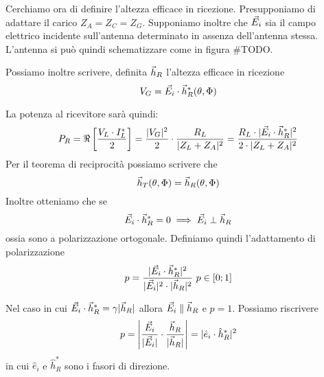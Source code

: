Cerchiamo ora di definire l'altezza efficace in ricezione. Presupponiamo di adattare il carico $Z_A=Z_C=Z_G$. Supponiamo inoltre che $\vec{E}_i$ sia il campo elettrico incidente sull'antenna determinato in assenza dell'antenna stessa. L'antenna si può quindi schematizzare come in figura \#TODO.

Possiamo inoltre scrivere, definita $\vec{h}_R$ l'altezza efficace in ricezione
\begin{equation}
  V_G=\vec{E}_i \cdot \vec{h}_R^*(\theta,\Phi)
\end{equation}

La potenza al ricevitore sarà quindi:
\begin{equation}
  P_R=\Re\left[\frac{V_L \cdot I_L^*}{2}\right] = \frac{|V_G|^2}{2} \cdot \frac{R_L}{|Z_L+Z_A|^2} =\frac{R_L \cdot |\vec{E}_i \cdot \vec{h}_R^*|^2}{2\cdot|Z_L+Z_A|^2}
\end{equation}
Per il teorema di reciprocità possiamo scrivere che
\begin{equation}
  \vec{h}_T(\theta,\Phi) = \vec{h}_R(\theta,\Phi)
\end{equation}
Inoltre otteniamo che se
\begin{equation}
  \vec{E}_i \cdot \vec{h}_R^* =0 \implies \vec{E}_i \perp \vec{h}_R
\end{equation}
ossia sono a polarizzazione ortogonale.
Definiamo quindi l'adattamento di polarizzazione
\begin{equation}
  p=\frac{|\vec{E}_i \cdot \vec{h}_R^*|^2}{|\vec{E}_i|^2 \cdot |\vec{h}_R|^2} ~ p \in [0;1]
\end{equation}

Nel caso in cui $\vec{E}_i \cdot \vec{h}_R^* = \gamma |\vec{h}_R|$ allora $\vec{E}_i \parallel \vec{h}_R$ e $p=1$. Possiamo riscrivere
\begin{equation}
  p= \left|\frac{\vec{E}_i}{|\vec{E}_i|}\cdot\frac{\vec{h}_R}{|\vec{h}_R|}\right| = |\hat{e}_i \cdot \hat{h}_R^*|^2
\end{equation}
in cui $\hat{e}_i$ e $\hat{h}_R^*$ sono i fasori di direzione.

